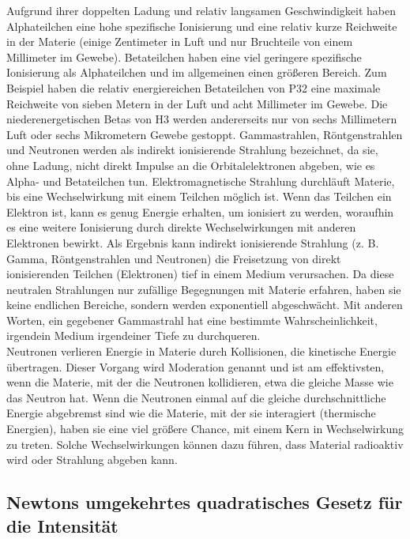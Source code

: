 {{Aufgrund ihrer doppelten Ladung und relativ langsamen Geschwindigkeit haben Alphateilchen eine hohe spezifische Ionisierung und eine relativ kurze Reichweite in der Materie (einige Zentimeter in Luft und nur Bruchteile von einem Millimeter im Gewebe). Betateilchen haben eine viel geringere spezifische Ionisierung als Alphateilchen und im allgemeinen einen größeren Bereich. Zum Beispiel haben die relativ energiereichen Betateilchen von P32 eine maximale Reichweite von sieben Metern in der Luft und acht Millimeter im Gewebe. Die niederenergetischen Betas von H3 werden andererseits nur von sechs Millimetern Luft oder sechs Mikrometern Gewebe gestoppt.
Gammastrahlen, Röntgenstrahlen und Neutronen werden als indirekt ionisierende Strahlung bezeichnet, da sie, ohne Ladung, nicht direkt Impulse an die Orbitalelektronen abgeben, wie es Alpha- und Betateilchen tun. Elektromagnetische Strahlung durchläuft Materie, bis eine Wechselwirkung mit einem Teilchen möglich ist. Wenn das Teilchen ein Elektron ist, kann es genug Energie erhalten, um ionisiert zu werden, woraufhin es eine weitere Ionisierung durch direkte Wechselwirkungen mit anderen Elektronen bewirkt. Als Ergebnis kann indirekt ionisierende Strahlung (z. B. Gamma, Röntgenstrahlen und Neutronen) die Freisetzung von direkt ionisierenden Teilchen (Elektronen) tief in einem Medium verursachen. Da diese neutralen Strahlungen nur zufällige Begegnungen mit Materie erfahren, haben sie keine endlichen Bereiche, sondern werden exponentiell abgeschwächt. Mit anderen Worten, ein gegebener Gammastrahl hat eine bestimmte Wahrscheinlichkeit, irgendein Medium irgendeiner Tiefe zu durchqueren.\\
Neutronen verlieren Energie in Materie durch Kollisionen, die kinetische Energie übertragen. Dieser Vorgang wird Moderation genannt und ist am effektivsten, wenn die Materie, mit der die Neutronen kollidieren, etwa die gleiche Masse wie das Neutron hat. Wenn die Neutronen einmal auf die gleiche durchschnittliche Energie abgebremst sind wie die Materie, mit der sie interagiert (thermische Energien), haben sie eine viel größere Chance, mit einem Kern in Wechselwirkung zu treten. Solche Wechselwirkungen können dazu führen, dass Material radioaktiv wird oder Strahlung abgeben kann.

\subsection{Newtons umgekehrtes quadratisches Gesetz für die Intensität}

}}
